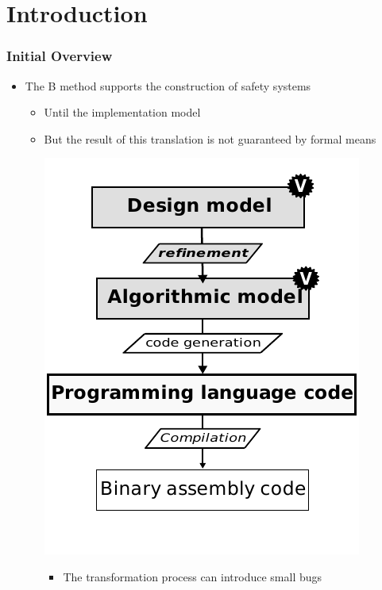 
\section{Introduction}


\begin{frame}
\frametitle{Initial Overview}

\begin{itemize}[<+->]
  \item The B method supports the construction of safety systems
  \begin{itemize}
    \item Until the implementation model
    \item But the result of this translation is not guaranteed by formal means\\
    \begin{center}
       \includegraphics[height=.5\textheight]{figures/b-method-actual_new.pdf}
    \end{center}
       \begin{itemize} \item   \small{The transformation process can introduce small bugs}
       \end{itemize}
  \end{itemize}
\end{itemize}
   

	
\end{frame}



